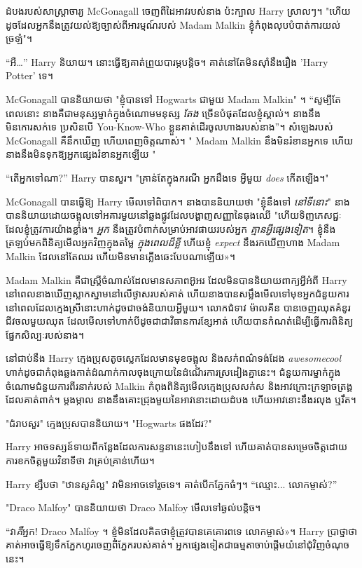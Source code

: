 ដំបងរបស់សាស្រ្តាចារ្យ McGonagall ចេញពីដៃអាវរបស់នាង ប៉ះក្បាល Harry ស្រាលៗ។ "ហើយ​ដូច​ដែល​អ្នក​នឹង​ត្រូវ​យល់​ឱ្យ​ច្បាស់​ពី​អារម្មណ៍​របស់ Madam Malkin ខ្ញុំ​កំពុង​លុប​បំបាត់​ការ​យល់​ច្រឡំ"។

“អឺ…” Harry និយាយ។ នោះធ្វើឱ្យគាត់ព្រួយបារម្ភបន្តិច។ គាត់នៅតែមិនស៊ាំនឹងរឿង 'Harry Potter' ទេ។

McGonagall បាននិយាយថា "ខ្ញុំបានទៅ Hogwarts ជាមួយ Madam Malkin" ។ “សូម្បីតែពេលនោះ នាងគឺជាមនុស្សម្នាក់ក្នុងចំណោមមនុស្ស \emph{តែង} ច្រើនបំផុតដែលខ្ញុំស្គាល់។ នាងនឹងមិនកោរសក់ទេ ប្រសិនបើ You-Know-Who ខ្លួនគាត់ដើរចូលហាងរបស់នាង”។ សំឡេងរបស់ McGonagall គឺនឹកឃើញ ហើយពេញចិត្តណាស់។ " Madam Malkin នឹងមិនរំខានអ្នកទេ ហើយនាងនឹងមិនទុកឱ្យអ្នកផ្សេងរំខានអ្នកឡើយ "

“តើអ្នកទៅណា?” Harry បានសួរ។ "គ្រាន់តែក្នុងករណី អ្នកដឹងទេ អ្វីមួយ \emph{does} កើតឡើង។"

McGonagall បានធ្វើឱ្យ Harry មើលទៅពិបាក។ នាងបាននិយាយថា "ខ្ញុំនឹងទៅ \emph{នៅទីនោះ}" នាងបាននិយាយដោយចង្អុលទៅអគារមួយនៅឆ្លងផ្លូវដែលបង្ហាញសញ្ញានៃធុងឈើ "ហើយទិញភេសជ្ជៈដែលខ្ញុំត្រូវការយ៉ាងខ្លាំង។ \emph{អ្នក} នឹងត្រូវបំពាក់សម្រាប់អាវផាយរបស់អ្នក \emph{គ្មានអ្វីផ្សេងទៀត}។ ខ្ញុំ​នឹង​ត្រឡប់​មក​ពិនិត្យ​មើល​អ្នក​វិញ​ក្នុង​តម្លៃ \emph{ក្នុង​ពេល​ដ៏ខ្លី} ហើយ​ខ្ញុំ \emph{expect} នឹង​រក​ឃើញ​ហាង Madam Malkin ដែល​នៅ​តែ​ឈរ ហើយ​មិន​មាន​ភ្លើង​ឆេះ​បែប​ណា​ឡើយ»។

Madam Malkin គឺជាស្ត្រីចំណាស់ដែលមានសភាពអ៊ូអរ ដែលមិនបាននិយាយពាក្យអ្វីអំពី Harry នៅពេលនាងឃើញស្លាកស្នាមនៅលើថ្ងាសរបស់គាត់ ហើយនាងបានសម្លឹងមើលទៅមុខអ្នកជំនួយការ នៅពេលដែលក្មេងស្រីនោះហាក់ដូចជាចង់និយាយអ្វីមួយ។ លោកជំទាវ ម៉ាលគីន បានចេញឈុតគំនូរជីវចលមួយឈុត ដែលមើលទៅហាក់បីដូចជាជាវិធានការខ្សែអាត់ ហើយបានកំណត់ដើម្បីធ្វើការពិនិត្យផ្នែកសិល្បៈរបស់នាង។

នៅជាប់នឹង Harry ក្មេងប្រុសតូចស្លេកដែលមានមុខចង្អុល និងសក់ពណ៌ទង់ដែង \emph{awesomecool} ហាក់ដូចជាកំពុងឆ្លងកាត់ដំណាក់កាលចុងក្រោយនៃដំណើរការស្រដៀងគ្នានេះ។ ជំនួយការម្នាក់ក្នុងចំណោមជំនួយការពីរនាក់របស់ Malkin កំពុងពិនិត្យមើលក្មេងប្រុសសក់ស និងអាវក្រោះក្រឡាចត្រង្គដែលគាត់ពាក់។ ម្តងម្កាល នាង​នឹង​គោះ​ជ្រុង​មួយ​នៃ​អាវ​នោះ​ដោយ​ដំបង ហើយ​អាវ​នោះ​នឹង​រលុង ឬ​រឹត​។

"ជំរាបសួរ" ក្មេងប្រុសបាននិយាយ។ "Hogwarts ផងដែរ?"

Harry អាចទស្សន៍ទាយពីកន្លែងដែលការសន្ទនានេះហៀបនឹងទៅ ហើយគាត់បានសម្រេចចិត្តដោយការខកចិត្តមួយវិនាទីថា វាគ្រប់គ្រាន់ហើយ។

Harry ខ្សឹបថា "ឋានសួគ៌ល្អ" វាមិនអាចទៅរួចទេ។ គាត់បើកភ្នែកធំៗ។ “ឈ្មោះ... លោកម្ចាស់?”

"Draco Malfoy" បាននិយាយថា Draco Malfoy មើលទៅឆ្ងល់បន្តិច។

“វា\emph{គឺ}អ្នក! Draco Malfoy ។ ខ្ញុំ​មិន​ដែល​គិត​ថា​ខ្ញុំ​ត្រូវ​បាន​គេ​គោរព​ទេ លោក​ម្ចាស់»។ Harry ប្រាថ្នាថាគាត់អាចធ្វើឱ្យទឹកភ្នែកហូរចេញពីភ្នែករបស់គាត់។ អ្នកផ្សេងទៀតជាធម្មតាចាប់ផ្តើមយំនៅជុំវិញចំណុចនេះ។

